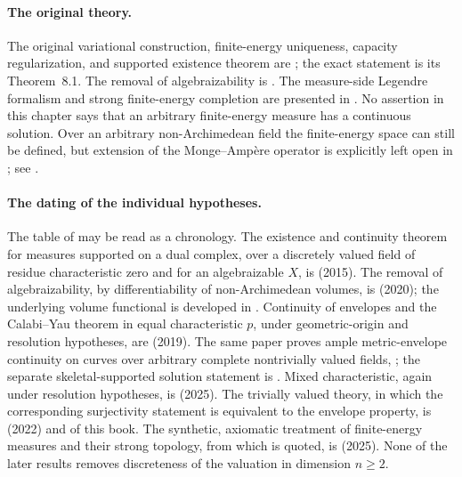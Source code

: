 \enlargethispage{2\baselineskip}

\paragraph{The original theory.}
The original variational construction, finite-energy uniqueness, capacity
regularization, and supported existence theorem are
\cite[\S\S6--8]{BFJ15}; the exact statement is its Theorem~8.1.  The
removal of algebraizability is \cite{BGGJKM20}.  The measure-side Legendre
formalism and strong finite-energy completion are presented in
\cite{BJ25FiniteEnergy}.  No assertion in this chapter says that an
arbitrary finite-energy measure has a continuous solution.
Over an arbitrary non-Archimedean field the finite-energy space can still be
defined, but extension of the Monge--Amp\`ere operator is explicitly left
open in \cite[Remark~4.4]{PS23Hybrid}; see
.

\paragraph{The dating of the individual hypotheses.}
The table of  may be read as a chronology.  The
existence and continuity theorem for measures supported on a dual complex,
over a discretely valued field of residue characteristic zero and for an
algebraizable \(X\), is \cite{BFJ15} (2015).  The removal of
algebraizability, by differentiability of non-Archimedean volumes, is
\cite[Theorem~6.3.3 and Corollary~6.3.4]{BGGJKM20} (2020); the underlying
volume functional is developed in \cite{BGM21}.  Continuity of envelopes and
the Calabi--Yau theorem in equal characteristic \(p\), under geometric-origin
and resolution hypotheses, are \cite[Theorems~1.4, 8.2, 9.2 and~9.3]{GJKM19}
(2019).  The same paper proves ample metric-envelope continuity on
curves over arbitrary complete nontrivially valued fields,
\cite[Theorem~1.1]{GJKM19}; the separate skeletal-supported solution
statement is .
Mixed characteristic,
again under resolution hypotheses, is \cite{FGK25} (2025).  The trivially
valued theory, in which the corresponding surjectivity statement is
equivalent to the envelope property, is \cite[\S\S7--12]{BJ22} (2022) and
 of this book.  The synthetic, axiomatic treatment of
finite-energy measures and their strong topology, from which
 is quoted, is
\cite{BJ25FiniteEnergy} (2025).  None of the later results removes
discreteness of the valuation in dimension \(n\geq2\).


